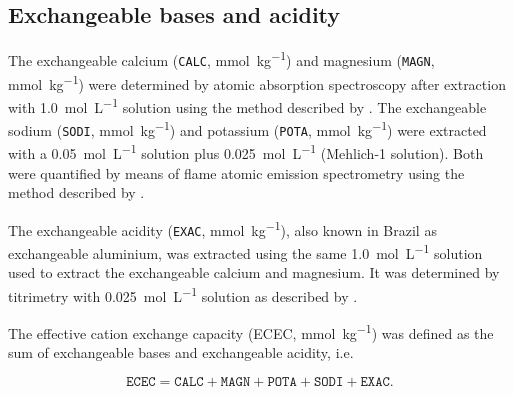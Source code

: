 \tocless\subsection{Exchangeable bases and acidity}

The exchangeable calcium (\texttt{CALC}, \si{\milli\mole\per\kilo\gram}) and magnesium (\texttt{MAGN}, 
\si{\milli\mole\per\kilo\gram}) were determined by atomic absorption spectroscopy after extraction with 
\SI{1.0}{\mole\per\liter}  solution using the method described by . 
The exchangeable sodium (\texttt{SODI}, \si{\milli\mole\per\kilo\gram}) and potassium (\texttt{POTA}, 
\si{\milli\mole\per\kilo\gram}) were extracted with a \SI{0.05}{\mole\per\liter}  solution plus 
\SI{0.025}{\mole\per\liter}  (Mehlich-\num{1} solution). Both were quantified by means of flame 
atomic emission spectrometry using the method described by .

The exchangeable acidity (\texttt{EXAC}, \si{\milli\mole\per\kilo\gram}), also known in Brazil as exchangeable 
aluminium, was extracted using the same \SI{1.0}{\mole\per\liter}  solution used to extract the 
exchangeable calcium and magnesium. It was determined by titrimetry with \SI{0.025}{\mole\per\liter} 
 solution as described by .


The effective cation exchange capacity (ECEC, \si{\milli\mole\per\kilo\gram}) was defined as the sum of 
exchangeable bases and exchangeable acidity, i.e. 

\begin{equation}
 \texttt{ECEC} = \texttt{CALC} + \texttt{MAGN} + \texttt{POTA} + \texttt{SODI} + \texttt{EXAC}.
\end{equation}



